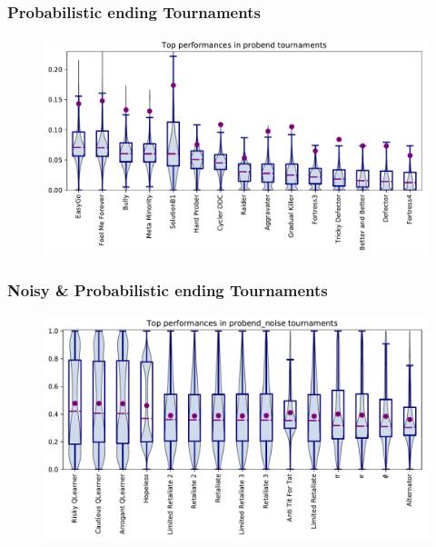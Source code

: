\documentclass{article}
\begin{document}
\subsubsection{Probabilistic ending Tournaments}

\begin{table}
    \begin{center}
    
    \end{center}
\end{table}

\begin{figure}
    \centering
    \includegraphics[width=.9\textwidth]{../images/performance_probend.pdf}
\end{figure}

\subsubsection{Noisy \& Probabilistic ending Tournaments}

\begin{table}
    \begin{center}
    
    \end{center}
\end{table}

\begin{figure}
    \centering
    \includegraphics[width=.9\textwidth]{../images/performance_probend_noise.pdf}
\end{figure}
\end{document}
